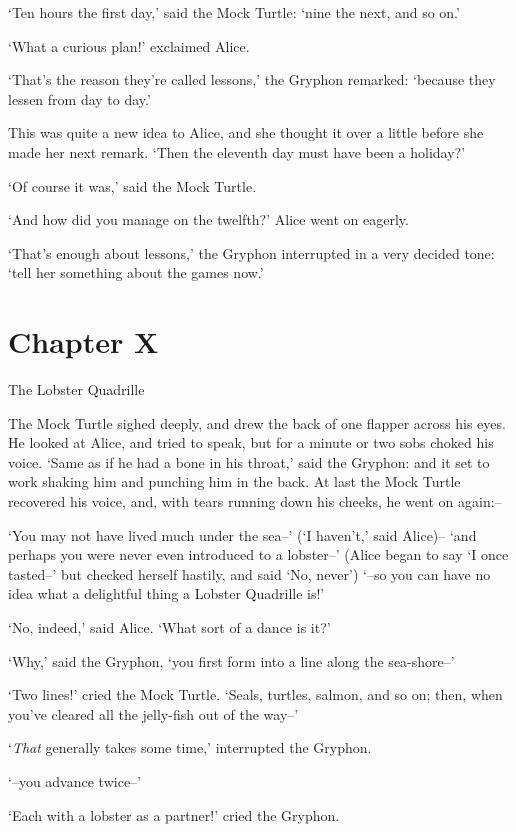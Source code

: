   `Ten hours the first day,' said the Mock Turtle: `nine the
next, and so on.'

  `What a curious plan!' exclaimed Alice.

  `That's the reason they're called lessons,' the Gryphon
remarked:  `because they lessen from day to day.'

  This was quite a new idea to Alice, and she thought it over a
little before she made her next remark.  `Then the eleventh day
must have been a holiday?'

  `Of course it was,' said the Mock Turtle.

  `And how did you manage on the twelfth?' Alice went on eagerly.

  `That's enough about lessons,' the Gryphon interrupted in a
very decided tone:  `tell her something about the games now.'



\chapter{Chapter X}{The Lobster Quadrille}


  The Mock Turtle sighed deeply, and drew the back of one flapper
across his eyes.  He looked at Alice, and tried to speak, but for
a minute or two sobs choked his voice.  `Same as if he had a bone
in his throat,' said the Gryphon:  and it set to work shaking him
and punching him in the back.  At last the Mock Turtle recovered
his voice, and, with tears running down his cheeks, he went on
again:--

  `You may not have lived much under the sea--' (`I haven't,' said Alice)--
`and perhaps you were never even introduced to a lobster--'
(Alice began to say `I once tasted--' but checked herself hastily,
and said `No, never') `--so you can have no idea what a delightful
thing a Lobster Quadrille is!'

  `No, indeed,' said Alice.  `What sort of a dance is it?'

  `Why,' said the Gryphon, `you first form into a line along the sea-shore--'

  `Two lines!' cried the Mock Turtle.  `Seals, turtles, salmon, and so on;
then, when you've cleared all the jelly-fish out of the way--'

  `{\it That} generally takes some time,' interrupted the Gryphon.

  `--you advance twice--'

  `Each with a lobster as a partner!' cried the Gryphon.

